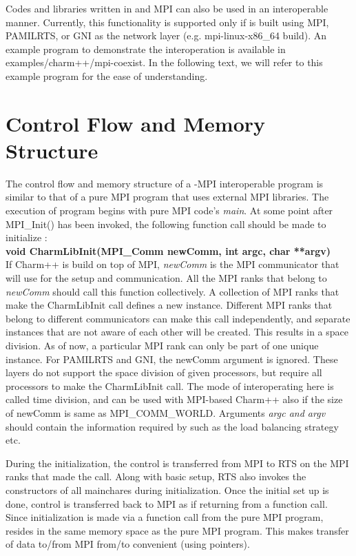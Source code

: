 Codes and libraries written in \charmpp{} and MPI can also be used in an
interoperable manner.  Currently, this functionality is supported only if
\charmpp{} is built using MPI, PAMILRTS, or GNI as the network layer (e.g.
mpi-linux-x86\_64 build).  An example program to demonstrate the interoperation
is available in examples/charm++/mpi-coexist. In the following text, we will
refer to this example program for the ease of understanding.

\section{Control Flow and Memory Structure}
The control flow and memory structure of a \charmpp{}-MPI interoperable program  is
similar to that of a pure MPI program that uses external MPI libraries. The
execution of program begins with pure MPI code's {\em main}. At some point after
MPI\_Init() has been invoked, the following function call should be made to initialize
\charmpp{}: \\

{\bf void CharmLibInit(MPI\_Comm newComm, int argc, char **argv)}\\

\noindent If Charm++ is build on top of MPI, {\em newComm} is the MPI
communicator that \charmpp{} will use for the setup and communication. All the
MPI ranks that belong to {\em newComm} should call this function collectively.  A collection of
MPI ranks that make the CharmLibInit call defines a new \charmpp{} instance.
Different MPI ranks that belong to different communicators can make this call
independently, and separate \charmpp{} instances that are not aware of each
other will be created. This results in a space division. As of now, a particular MPI
rank can only be part of one unique \charmpp{} instance. For PAMILRTS and GNI,
the newComm argument is ignored. These layers do not support the space division
of given processors, but require all processors to make the CharmLibInit call.
The mode of interoperating here is called time division, and can be used with
MPI-based Charm++ also if the size of newComm is same as MPI\_COMM\_WORLD.
Arguments {\em argc and argv} should contain the information required by
\charmpp{} such as the load balancing strategy etc.

During the initialization, the control is transferred from MPI to \charmpp{}
RTS on the MPI ranks that made the call. Along with basic setup, \charmpp{} RTS also invokes
the constructors of all mainchares during initialization. Once the initial set up
is done, control is transferred back to MPI as if returning from a function call.
Since \charmpp{} initialization is made via a function call from the pure MPI
program, \charmpp{} resides in the same memory space as the pure MPI program. This
makes transfer of data to/from MPI from/to \charmpp{} convenient (using pointers).

